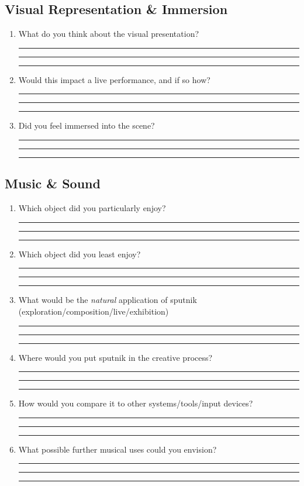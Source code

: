 \documentclass[10pt,a4paper]{scrartcl}
\begin{document}
\subsection{Visual Representation \& Immersion}
\begin{enumerate}
\item What do you think about the visual presentation?\\
\rule{\linewidth}{0.25pt}
\rule{\linewidth}{0.25pt}
\rule{\linewidth}{0.25pt}

\item Would this impact a live performance, and if so how?\\
\rule{\linewidth}{0.25pt}
\rule{\linewidth}{0.25pt}
\rule{\linewidth}{0.25pt}

\item Did you feel immersed into the scene?\\
\rule{\linewidth}{0.25pt}
\rule{\linewidth}{0.25pt}
\rule{\linewidth}{0.25pt}

\end{enumerate}

\subsection{Music \& Sound}
\begin{enumerate}

\item Which object did you particularly enjoy?\\
\rule{\linewidth}{0.25pt}
\rule{\linewidth}{0.25pt}
\rule{\linewidth}{0.25pt}

\item Which object did you least enjoy?\\
\rule{\linewidth}{0.25pt}
\rule{\linewidth}{0.25pt}
\rule{\linewidth}{0.25pt}

\item What would be the \emph{natural} application of sputnik (exploration/composition/live/exhibition)\\
\rule{\linewidth}{0.25pt}
\rule{\linewidth}{0.25pt}
\rule{\linewidth}{0.25pt}

\item Where would you put sputnik in the creative process?\\
\rule{\linewidth}{0.25pt}
\rule{\linewidth}{0.25pt}
\rule{\linewidth}{0.25pt}

\item How would you compare it to other systems/tools/input devices?\\
\rule{\linewidth}{0.25pt}
\rule{\linewidth}{0.25pt}
\rule{\linewidth}{0.25pt}

\item What possible further musical uses could you envision?\\
\rule{\linewidth}{0.25pt}
\rule{\linewidth}{0.25pt}
\rule{\linewidth}{0.25pt}





\end{enumerate}
\end{document}
